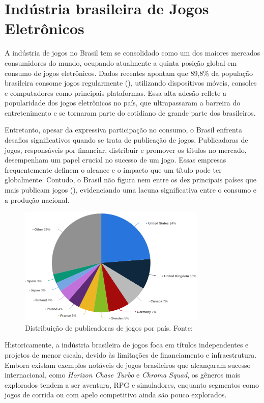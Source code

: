 \chapter{Indústria brasileira de Jogos Eletrônicos}

A indústria de jogos no Brasil tem se consolidado como um dos maiores mercados consumidores do mundo, ocupando atualmente a quinta posição global em consumo de jogos eletrônicos. Dados recentes apontam que 89,8\% da população brasileira consome jogos regularmente (\cite{internetGame:share}), utilizando dispositivos móveis, consoles e computadores como principais plataformas. Essa alta adesão reflete a popularidade dos jogos eletrônicos no país, que ultrapassaram a barreira do entretenimento e se tornaram parte do cotidiano de grande parte dos brasileiros.

Entretanto, apesar da expressiva participação no consumo, o Brasil enfrenta desafios significativos quando se trata de publicação de jogos. Publicadoras de jogos, responsáveis por financiar, distribuir e promover os títulos no mercado, desempenham um papel crucial no sucesso de um jogo. Essas empresas frequentemente definem o alcance e o impacto que um título pode ter globalmente. Contudo, o Brasil não figura nem entre os dez principais países que mais publicam jogos (\cite{publishers:country}), evidenciando uma lacuna significativa entre o consumo e a produção nacional.

\begin{figure}[H]
    \centering
    \includegraphics[width=0.8\textwidth]{figuras/Devs by Country.png}
    \caption{Distribuição de publicadoras de jogos por país. Fonte: \cite{publishers:country}}
    \label{fig:jogos-brasil}
\end{figure}

Historicamente, a indústria brasileira de jogos foca em títulos independentes e projetos de menor escala, devido às limitações de financiamento e infraestrutura. Embora existam exemplos notáveis de jogos brasileiros que alcançaram sucesso internacional, como \textit{Horizon Chase Turbo}\label{Língua estrangeira} e \textit{Chroma Squad}, os gêneros mais explorados tendem a ser aventura, RPG e simuladores, enquanto segmentos como jogos de corrida ou com apelo competitivo ainda são pouco explorados.

